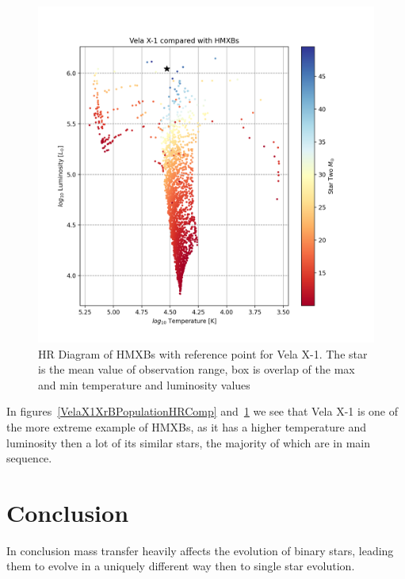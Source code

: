 \documentclass[12pt, a4paper]{article}
\begin{document}
            \begin{figure}[H] 
                \centering
                \includegraphics[scale = .6]{figs/GeneratedFigs/VelaX-1/VelaX1HMXBPopulationHRComp.png}
                \caption{HR Diagram of HMXBs with reference point for Vela X-1. The star is the mean value of observation range, box is overlap of the max and min temperature and luminosity values}
                \label{VelaX1HMXBPopulationHRComp}
            \end{figure}


            In figures~\ref{VelaX1XrBPopulationHRComp} and~\ref{VelaX1HMXBPopulationHRComp} we see that Vela X-1 is one of the more extreme example of HMXBs, as it has a higher temperature and luminosity then a lot of its similar stars, the majority of which are in main sequence.
            

\section{\centering Conclusion}
    In conclusion mass transfer heavily affects the evolution of binary stars, leading them to evolve in a uniquely different way then to single star evolution. 
\end{document}
